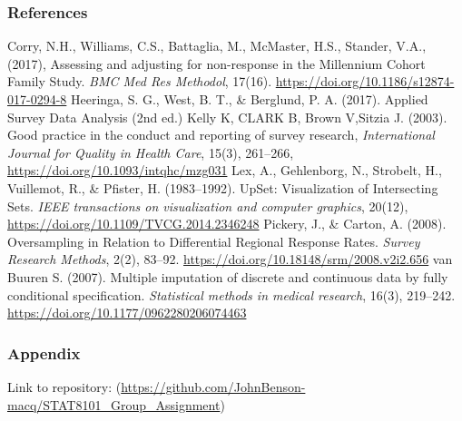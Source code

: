 \documentclass[
  12pt,
]{article}
\begin{document}
\hypertarget{references}{%
\subsubsection{References}\label{references}}

Corry, N.H., Williams, C.S., Battaglia, M., McMaster, H.S., Stander,
V.A., (2017), Assessing and adjusting for non-response in the Millennium
Cohort Family Study. \emph{BMC Med Res Methodol}, 17(16).
\url{https://doi.org/10.1186/s12874-017-0294-8} \newline Heeringa, S.
G., West, B. T., \& Berglund, P. A. (2017). Applied Survey Data Analysis
(2nd ed.) \newline Kelly K, CLARK B, Brown V,Sitzia J. (2003). Good
practice in the conduct and reporting of survey research,
\emph{International Journal for Quality in Health Care}, 15(3),
261--266, \url{https://doi.org/10.1093/intqhc/mzg031} \newline Lex, A.,
Gehlenborg, N., Strobelt, H., Vuillemot, R., \& Pfister, H.
(1983--1992). UpSet: Visualization of Intersecting Sets. \emph{IEEE
transactions on visualization and computer graphics}, 20(12),
\url{https://doi.org/10.1109/TVCG.2014.2346248} \newline Pickery, J., \&
Carton, A. (2008). Oversampling in Relation to Differential Regional
Response Rates. \emph{Survey Research Methods}, 2(2), 83--92.
\url{https://doi.org/10.18148/srm/2008.v2i2.656} \newline van Buuren S.
(2007). Multiple imputation of discrete and continuous data by fully
conditional specification. \emph{Statistical methods in medical
research}, 16(3), 219--242.
\url{https://doi.org/10.1177/0962280206074463}

\hypertarget{appendix}{%
\subsubsection{Appendix}\label{appendix}}

Link to repository:
(\url{https://github.com/JohnBenson-macq/STAT8101_Group_Assignment})
\end{document}
